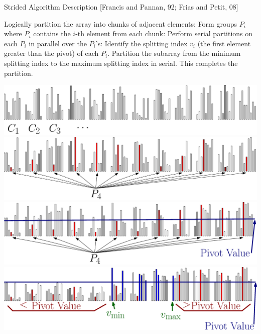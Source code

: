 \documentclass[xcolor=x11names, svgnames, rgb]{beamer}
\begin{document}
\begin{frame}[t]{Strided Algorithm Description [Francis and Pannan, 92; Frias and Petit, 08]}
	\vspace{0.25cm}
	\begin{overprint}
	Logically partition the array into chunks of adjacent elements:
	\onslide<2>Form groups $P_i$ where $P_i$ contains the $i$-th element from each chunk:
	\onslide<3>Perform serial partitions on each $P_i$ in parallel over the $P_i$'s:
	\onslide<4>Identify the splitting index $v_i$ (the first element greater than the pivot) of each $P_i$. 
	\onslide<5>Partition the subarray from the minimum splitting index to the maximum splitting index in serial. This completes the partition. 
	\end{overprint}
	\vspace{0.25cm}
	\begin{overprint}
	\includegraphics[width=\linewidth]{imgs/stridedAlgSim1Ann.eps}
	\onslide<2>\includegraphics[width=\linewidth]{imgs/stridedAlgSim2Ann.eps}
	\onslide<3>\includegraphics[width=\linewidth]{imgs/stridedAlgSim3Ann.eps}
	\onslide<4>\includegraphics[width=\linewidth]{imgs/stridedAlgSim4Ann.eps}

\end{overprint}
\end{frame}
\end{document}

